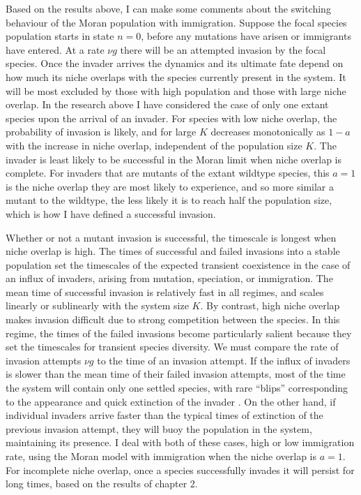 Based on the results above, I can make some comments about the switching behaviour of the Moran population with immigration. 
Suppose the focal species population starts in state $n=0$, before any mutations have arisen or immigrants have entered.  
At a rate $\nu g$ there will be an attempted invasion by the focal species. 
Once the invader arrives the dynamics and its ultimate fate depend on how much its niche overlaps with the species currently present in the system. 
It will be most excluded by those with high population and those with large niche overlap. 
In the research above I have considered the case of only one extant species upon the arrival of an invader. 
For species with low niche overlap, the probability of invasion is likely, and for large $K$ decreases monotonically as $1-a$ with the increase in niche overlap, independent of the population size $K$. %
The invader is least likely to be successful in the Moran limit when niche overlap is complete. 
For invaders that are mutants of the extant wildtype species, this $a=1$ is the niche overlap they are most likely to experience, and so more similar a mutant to the wildtype, the less likely it is to reach half the population size, which is how I have defined a successful invasion. 

Whether or not a mutant invasion is successful, the timescale is longest when niche overlap is high. %
The times of successful and failed invasions into a stable population set the timescales of the expected transient coexistence in the case of an influx of invaders, arising from mutation, speciation, or immigration. 
The mean time of successful invasion is relatively fast in all regimes, and scales linearly or sublinearly with the system size $K$. 
By contrast, high niche overlap makes invasion difficult due to strong competition between the species. 
In this regime, the times of the failed invasions become particularly salient because they set the timescales for transient species diversity. 
We must compare the rate of invasion attempts $\nu g$ to the time of an invasion attempt. 
If the influx of invaders is slower than the mean time of their failed invasion attempts, most of the time the system will contain only one settled species, with rare ``blips'' corresponding to the appearance and quick extinction of the invader \cite{Dias1996,Hubbell2001,Chesson2000}. 
On the other hand, if individual invaders arrive faster than the typical times of extinction of the previous invasion attempt, they will buoy the population in the system, maintaining its presence. %
I deal with both of these cases, high or low immigration rate, using the Moran model with immigration when the niche overlap is $a=1$. 
For incomplete niche overlap, once a species successfully invades it will persist for long times, based on the results of chapter 2. 


